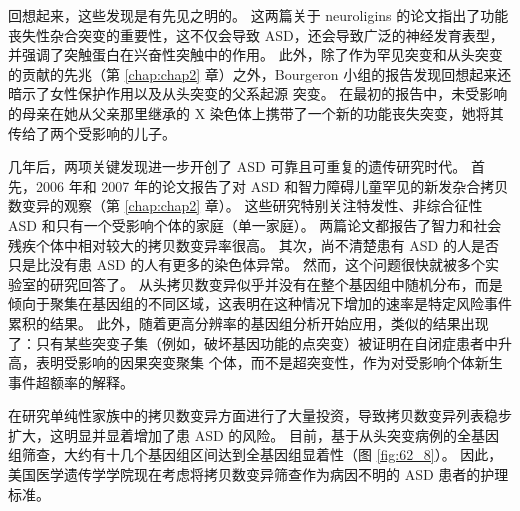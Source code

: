 回想起来，这些发现是有先见之明的。 这两篇关于 neuroligins 的论文指出了功能丧失性杂合突变的重要性，这不仅会导致 ASD，还会导致广泛的神经发育表型，并强调了突触蛋白在兴奋性突触中的作用。 此外，除了作为罕见突变和从头突变的贡献的先兆（第 \ref{chap:chap2} 章）之外，Bourgeron 小组的报告发现回想起来还暗示了女性保护作用以及从头突变的父系起源 突变。 在最初的报告中，未受影响的母亲在她从父亲那里继承的 X 染色体上携带了一个新的功能丧失突变，她将其传给了两个受影响的儿子。

几年后，两项关键发现进一步开创了 ASD 可靠且可重复的遗传研究时代。 首先，2006 年和 2007 年的论文报告了对 ASD 和智力障碍儿童罕见的新发杂合拷贝数变异的观察（第 \ref{chap:chap2} 章）。 这些研究特别关注特发性、非综合征性 ASD 和只有一个受影响个体的家庭（单一家庭）。 两篇论文都报告了智力和社会残疾个体中相对较大的拷贝数变异率很高。 其次，尚不清楚患有 ASD 的人是否只是比没有患 ASD 的人有更多的染色体异常。 然而，这个问题很快就被多个实验室的研究回答了。 从头拷贝数变异似乎并没有在整个基因组中随机分布，而是倾向于聚集在基因组的不同区域，这表明在这种情况下增加的速率是特定风险事件累积的结果。 此外，随着更高分辨率的基因组分析开始应用，类似的结果出现了：只有某些突变子集（例如，破坏基因功能的点突变）被证明在自闭症患者中升高，表明受影响的因果突变聚集 个体，而不是超突变性，作为对受影响个体新生事件超额率的解释。

在研究单纯性家族中的拷贝数变异方面进行了大量投资，导致拷贝数变异列表稳步扩大，这明显并显着增加了患 ASD 的风险。 目前，基于从头突变病例的全基因组筛查，大约有十几个基因组区间达到全基因组显着性（图 \ref{fig:62_8}）。 因此，美国医学遗传学学院现在考虑将拷贝数变异筛查作为病因不明的 ASD 患者的护理标准。

